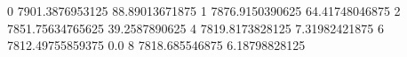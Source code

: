 0 7901.3876953125 88.89013671875
1 7876.9150390625 64.41748046875
2 7851.75634765625 39.2587890625
4 7819.8173828125 7.31982421875
6 7812.49755859375 0.0
8 7818.685546875 6.18798828125
